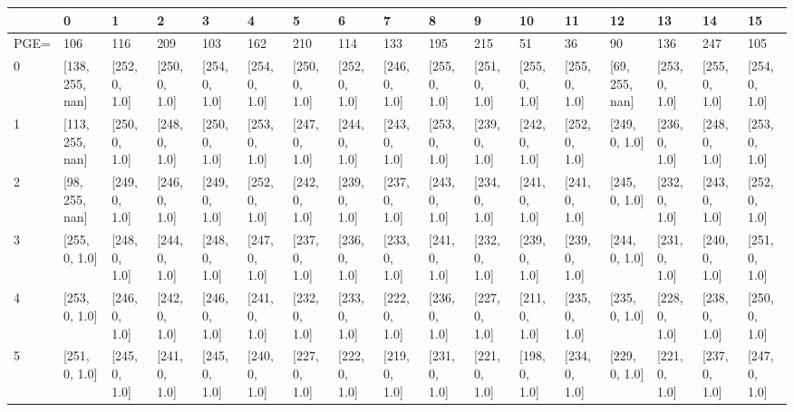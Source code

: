 \begin{tabular}{lllllllllllllllll}
\toprule
{} &               0  &             1  &             2  &             3  &             4  &             5  &             6  &             7  &             8  &             9  &             10 &             11 &              12 &             13 &             14 &             15 \\
\midrule
PGE= &              106 &            116 &            209 &            103 &            162 &            210 &            114 &            133 &            195 &            215 &             51 &             36 &              90 &            136 &            247 &            105 \\
0    &  [138, 255, nan] &  [252, 0, 1.0] &  [250, 0, 1.0] &  [254, 0, 1.0] &  [254, 0, 1.0] &  [250, 0, 1.0] &  [252, 0, 1.0] &  [246, 0, 1.0] &  [255, 0, 1.0] &  [251, 0, 1.0] &  [255, 0, 1.0] &  [255, 0, 1.0] &  [69, 255, nan] &  [253, 0, 1.0] &  [255, 0, 1.0] &  [254, 0, 1.0] \\
1    &  [113, 255, nan] &  [250, 0, 1.0] &  [248, 0, 1.0] &  [250, 0, 1.0] &  [253, 0, 1.0] &  [247, 0, 1.0] &  [244, 0, 1.0] &  [243, 0, 1.0] &  [253, 0, 1.0] &  [239, 0, 1.0] &  [242, 0, 1.0] &  [252, 0, 1.0] &   [249, 0, 1.0] &  [236, 0, 1.0] &  [248, 0, 1.0] &  [253, 0, 1.0] \\
2    &   [98, 255, nan] &  [249, 0, 1.0] &  [246, 0, 1.0] &  [249, 0, 1.0] &  [252, 0, 1.0] &  [242, 0, 1.0] &  [239, 0, 1.0] &  [237, 0, 1.0] &  [243, 0, 1.0] &  [234, 0, 1.0] &  [241, 0, 1.0] &  [241, 0, 1.0] &   [245, 0, 1.0] &  [232, 0, 1.0] &  [243, 0, 1.0] &  [252, 0, 1.0] \\
3    &    [255, 0, 1.0] &  [248, 0, 1.0] &  [244, 0, 1.0] &  [248, 0, 1.0] &  [247, 0, 1.0] &  [237, 0, 1.0] &  [236, 0, 1.0] &  [233, 0, 1.0] &  [241, 0, 1.0] &  [232, 0, 1.0] &  [239, 0, 1.0] &  [239, 0, 1.0] &   [244, 0, 1.0] &  [231, 0, 1.0] &  [240, 0, 1.0] &  [251, 0, 1.0] \\
4    &    [253, 0, 1.0] &  [246, 0, 1.0] &  [242, 0, 1.0] &  [246, 0, 1.0] &  [241, 0, 1.0] &  [232, 0, 1.0] &  [233, 0, 1.0] &  [222, 0, 1.0] &  [236, 0, 1.0] &  [227, 0, 1.0] &  [211, 0, 1.0] &  [235, 0, 1.0] &   [235, 0, 1.0] &  [228, 0, 1.0] &  [238, 0, 1.0] &  [250, 0, 1.0] \\
5    &    [251, 0, 1.0] &  [245, 0, 1.0] &  [241, 0, 1.0] &  [245, 0, 1.0] &  [240, 0, 1.0] &  [227, 0, 1.0] &  [222, 0, 1.0] &  [219, 0, 1.0] &  [231, 0, 1.0] &  [221, 0, 1.0] &  [198, 0, 1.0] &  [234, 0, 1.0] &   [229, 0, 1.0] &  [221, 0, 1.0] &  [237, 0, 1.0] &  [247, 0, 1.0] \\

\end{tabular}
